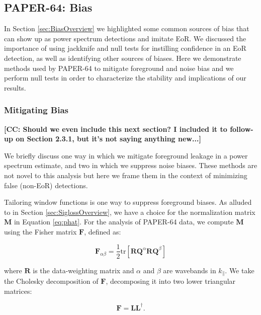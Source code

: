\documentclass[preprint2,numberedappendix,tighten]{aastex6}  %
\newcommand{\cc}[1]{{\color{purple} \textbf{[CC: #1]}}}
\begin{document}

\subsection{PAPER-64: Bias}
\label{sec:Bias}

In Section \ref{sec:BiasOverview} we highlighted some common sources of bias that can show up as power spectrum detections and imitate EoR. We discussed the importance of using jackknife and null tests for instilling confidence in an EoR detection, as well as identifying other sources of biases. Here we demonstrate methods used by PAPER-64 to mitigate foreground and noise bias and we perform null tests in order to characterize the stability and implications of our results.

\subsubsection{Mitigating Bias}

\cc{Should we even include this next section? I included it to follow-up on Section 2.3.1, but it's not saying anything new...}

We briefly discuss one way in which we mitigate foreground leakage in a power spectrum estimate, and two in which we suppress noise biases. These methods are not novel to this analysis but here we frame them in the context of minimizing false (non-EoR) detections.

Tailoring window functions is one way to suppress foreground biases. As alluded to in Section \ref{sec:SiglossOverview}, we have a choice for the normalization matrix $\textbf{M}$ in Equation \eqref{eq:phat}. For the analysis of PAPER-64 data, we compute $\textbf{M}$ using the Fisher matrix $\textbf{F}$, defined as:

\begin{equation}
\textbf{F}_{\alpha\beta} = \frac{1}{2} \text{tr} [\textbf{R}\textbf{Q}^{\alpha}\textbf{R}\textbf{Q}^{\beta} ]
\end{equation}

\noindent where $\textbf{R}$ is the data-weighting matrix and $\alpha$ and $\beta$ are wavebands in $k_{\parallel}$. We take the Cholesky decomposition of $\textbf{F}$, decomposing it into two lower triangular matrices:

\begin{equation}
\textbf{F} = \textbf{LL}^{\dagger}.
\end{equation}
\end{document}
